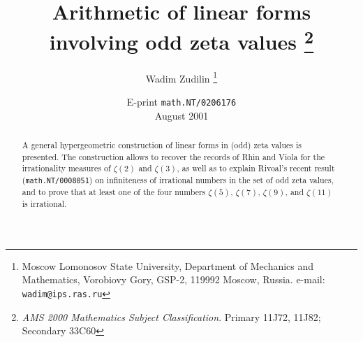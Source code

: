 \documentclass[a4paper,twoside]{article}
\numberwithin{equation}{section}
\renewcommand{\[}{\lfloor}
\renewcommand{\]}{\rfloor}
\newcommand{\<}{\langle}
\renewcommand{\>}{\rangle}
\begin{document}
\newtheorem{theorem}{Theorem}
\newtheorem{lemma}{Lemma}
\newtheorem{proposition}{Proposition}
\theoremstyle{remark}
\newtheorem*{rem}{Remark}
\newtheorem*{observation}{Observation}
\theoremstyle{plain}
\newtheorem*{conj}{Conjecture}
\title{Arithmetic of linear forms\\ involving odd zeta values%
\thanks{\textit{AMS 2000 Mathematics Subject Classification}.
Primary 11J72, 11J82; Secondary 33C60}}
\author{Wadim Zudilin%
\thanks{Moscow Lomonosov State University,
Department of Mechanics and Mathematics,
Vorobiovy Gory, GSP-2, 119992 Moscow, Russia.
e-mail: \texttt{wadim@ips.ras.ru}}}
\date{E-print \texttt{math.NT/0206176}\\[1.5mm] August 2001}
\maketitle
\pagestyle{myheadings}
\thispagestyle{empty}

\begin{abstract}
A general hypergeometric construction of linear forms in (odd) zeta values
is presented. The construction allows to recover the records of Rhin and
Viola for the irrationality measures of $\zeta(2)$ and $\zeta(3)$,
as well as to explain Rivoal's recent result (\texttt{math.NT/0008051})
on infiniteness of irrational numbers in the set of odd zeta values,
and to prove that at least one of the four numbers
$\zeta(5)$, $\zeta(7)$, $\zeta(9)$, and $\zeta(11)$ is irrational.
\end{abstract}

\end{document}
